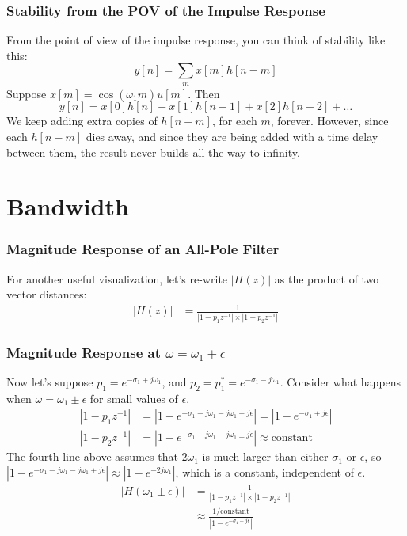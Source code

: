 \documentclass{beamer}
\begin{document}
\begin{frame}
  \centerline{}
\end{frame}

\begin{frame}
  \frametitle{Stability from the POV of the Impulse Response}
  From the point of view of the impulse response, you can think of stability like this:
  \[
  y[n] = \sum_m x[m]h[n-m]
  \]
  Suppose $x[m] = \cos(\omega_1 m)u[m]$.   Then
  \[
  y[n] = x[0]h[n] + x[1]h[n-1] + x[2]h[n-2] + \ldots
  \]
  We keep adding extra copies of $h[n-m]$, for each $m$, forever.
  However, since each $h[n-m]$ dies away, and since they are
  being added with a time delay between them, the result never builds
  all the way to infinity.
\end{frame}

\begin{frame}
  \centerline{}
\end{frame}
  

\section[Bandwidth]{Bandwidth}
\setcounter{subsection}{1}

\begin{frame}
  \frametitle{Magnitude Response of an All-Pole Filter}

  For another useful visualization, let's re-write $|H(z)|$ as the product of two
  vector distances:
  \begin{align*}
    |H(z)| &= \frac{1}{|1-p_1z^{-1}|\times |1-p_2z^{-1}|}
  \end{align*}
\end{frame}

\begin{frame}
  \frametitle{Magnitude Response at $\omega=\omega_1\pm\epsilon$}

  Now let's suppose $p_1=e^{-\sigma_1+j\omega_1}$, and
  $p_2=p_1^*=e^{-\sigma_1-j\omega_1}$.  Consider what happens when
  $\omega=\omega_1\pm\epsilon$ for small values of $\epsilon$.
  \begin{align*}
    |1-p_1z^{-1}| &=     \left|1-e^{-\sigma_1+j\omega_1-j\omega_1\pm j\epsilon}\right|
    = \left|1-e^{-\sigma_1\pm j\epsilon}\right|\\
    |1-p_2z^{-1}| &=\left|1-e^{-\sigma_1-j\omega_1-j\omega_1\pm j\epsilon}\right|
    \approx \text{constant}
  \end{align*}
  The fourth line above assumes that $2\omega_1$ is much larger than
  either $\sigma_1$ or $\epsilon$, so
  $\left|1-e^{-\sigma_1-j\omega_1-j\omega_1\pm
    j\epsilon}\right|\approx \left|1-e^{-2j\omega_1}\right|$,
  which is a constant, independent of $\epsilon$.
  \begin{align*}  
    \left| H(\omega_1\pm\epsilon)\right| &=\frac{1}{|1-p_1z^{-1}|\times |1-p_2z^{-1}|}\\
    &\approx \frac{1/\text{constant}}{\left|1-e^{-\sigma_1\pm j\epsilon}\right|}
  \end{align*}
\end{frame}
  
\end{document}
